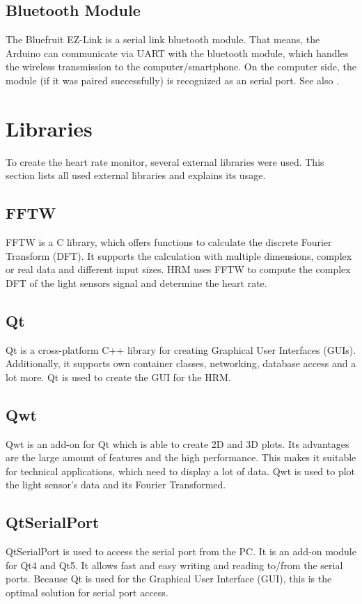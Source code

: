 \documentclass[notitlepage]{scrreprt}
\begin{document}
\subsection{Bluetooth Module}
The Bluefruit EZ-Link is a serial link bluetooth module. That means, the Arduino can communicate via UART with the bluetooth module, which handles the wireless transmission to the computer/smartphone. On the computer side, the module (if it was paired successfully) is recognized as an serial port. See also \cite{bib:bluetooth-adapter}.

\newpage

\section{Libraries}
To create the heart rate monitor, several external libraries were used. This section lists all used external libraries and explains its usage.

\subsection{FFTW}
FFTW is a C library, which offers functions to calculate the discrete Fourier Transform (DFT). It supports the calculation with multiple dimensions, complex or real data and different input sizes. HRM uses FFTW to compute the complex DFT of the light sensors signal and determine the heart rate.

\subsection{Qt}
Qt is a cross-platform C++ library for creating Graphical User Interfaces (GUIs). Additionally, it supports own container classes, networking, database access and a lot more. Qt is used to create the GUI for the HRM.

\subsection{Qwt}
Qwt is an add-on for Qt which is able to create 2D and 3D plots. Its advantages are the large amount of features and the high performance. This makes it suitable for technical applications, which need to display a lot of data. Qwt is used to plot the light sensor's data and its Fourier Transformed.

\subsection{QtSerialPort}
QtSerialPort is used to access the serial port from the PC. It is an add-on module for Qt4 and Qt5. It allows fast and easy writing and reading to/from the serial ports. Because Qt is used for the Graphical User Interface (GUI), this is the optimal solution for serial port access.
\end{document}
